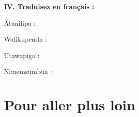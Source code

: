 \noindent\textbf{IV. Traduisez en français :}
\begin{keybox}
Atanilipa : \dotfill\hspace*{.45\linewidth}\mbox{}

Walikupenda : \dotfill\hspace*{.45\linewidth}\mbox{}

Utawapiga : \dotfill\hspace*{.45\linewidth}\mbox{}

Nimemsumbua : \dotfill\hspace*{.45\linewidth}\mbox{}
\end{keybox}

\section*{Pour aller plus loin}
